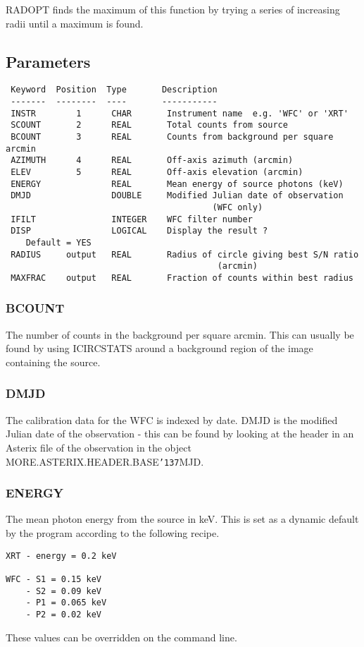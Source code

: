\documentclass{book}
\renewcommand{\_}{{\tt\char'137}}     %
\begin{document}
RADOPT finds the maximum of this function by trying a series of
increasing radii until a maximum is found.

\subsection{Parameters}
\begin{verbatim}
 Keyword  Position  Type       Description
 -------  --------  ----       -----------
 INSTR        1      CHAR       Instrument name  e.g. 'WFC' or 'XRT'
 SCOUNT       2      REAL       Total counts from source
 BCOUNT       3      REAL       Counts from background per square arcmin
 AZIMUTH      4      REAL       Off-axis azimuth (arcmin)
 ELEV         5      REAL       Off-axis elevation (arcmin)
 ENERGY              REAL       Mean energy of source photons (keV)
 DMJD                DOUBLE     Modified Julian date of observation
                                         (WFC only)
 IFILT               INTEGER    WFC filter number
 DISP                LOGICAL    Display the result ?
    Default = YES
 RADIUS     output   REAL       Radius of circle giving best S/N ratio
                                          (arcmin)
 MAXFRAC    output   REAL       Fraction of counts within best radius

\end{verbatim}\subsubsection{BCOUNT}
The number of counts in the background per square arcmin. This
can usually be found by using ICIRCSTATS around a background
region of the image containing the source.

\subsubsection{DMJD}
The calibration data for the WFC is indexed by date. DMJD is the
modified Julian date of the observation - this can be found by
looking at the header in an Asterix file of the observation in
the object MORE.ASTERIX.HEADER.BASE\_MJD.

\subsubsection{ENERGY}
The mean photon energy from the source in keV. This is set as a
dynamic default by the program according to the following recipe.

\begin{verbatim}
XRT - energy = 0.2 keV

WFC - S1 = 0.15 keV
    - S2 = 0.09 keV
    - P1 = 0.065 keV
    - P2 = 0.02 keV
\end{verbatim}
These values can be overridden on the command line.
\end{document}
